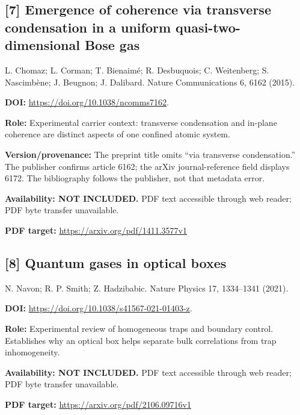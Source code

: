 \documentclass[11pt,a4paper]{article}
\begin{document}
\begin{minipage}{\textwidth}
\subsection*{[7] Emergence of coherence via transverse condensation in a uniform quasi-two-dimensional Bose gas}
L. Chomaz; L. Corman; T. Bienaim\'e; R. Desbuquois; C. Weitenberg; S. Nascimb\`ene; J. Beugnon; J. Dalibard. Nature Communications 6, 6162 (2015).

\textbf{DOI:} \url{https://doi.org/10.1038/ncomms7162}.

\textbf{Role:} Experimental carrier context: transverse condensation and in-plane coherence are distinct aspects of one confined atomic system.

\textbf{Version/provenance:} The preprint title omits ``via transverse condensation.'' The publisher confirms article 6162; the arXiv journal-reference field displays 6172. The bibliography follows the publisher, not that metadata error.

\textbf{Availability: NOT INCLUDED.} PDF text accessible through web reader; PDF byte transfer unavailable.\par
\textbf{PDF target:} \url{https://arxiv.org/pdf/1411.3577v1}
\end{minipage}
\par\medskip
\begin{minipage}{\textwidth}
\subsection*{[8] Quantum gases in optical boxes}
N. Navon; R. P. Smith; Z. Hadzibabic. Nature Physics 17, 1334--1341 (2021).

\textbf{DOI:} \url{https://doi.org/10.1038/s41567-021-01403-z}.

\textbf{Role:} Experimental review of homogeneous traps and boundary control. Establishes why an optical box helps separate bulk correlations from trap inhomogeneity.

\textbf{Availability: NOT INCLUDED.} PDF text accessible through web reader; PDF byte transfer unavailable.\par
\textbf{PDF target:} \url{https://arxiv.org/pdf/2106.09716v1}
\end{minipage}
\par\medskip
\end{document}
